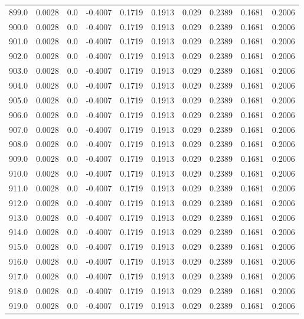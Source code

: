 \begin{longtable}{lrrrrrrrrr}
899.0 & 0.0028 & 0.0 & -0.4007 & 0.1719 & 0.1913 & 0.029 & 0.2389 & 0.1681 & 0.2006 \\
900.0 & 0.0028 & 0.0 & -0.4007 & 0.1719 & 0.1913 & 0.029 & 0.2389 & 0.1681 & 0.2006 \\
901.0 & 0.0028 & 0.0 & -0.4007 & 0.1719 & 0.1913 & 0.029 & 0.2389 & 0.1681 & 0.2006 \\
902.0 & 0.0028 & 0.0 & -0.4007 & 0.1719 & 0.1913 & 0.029 & 0.2389 & 0.1681 & 0.2006 \\
903.0 & 0.0028 & 0.0 & -0.4007 & 0.1719 & 0.1913 & 0.029 & 0.2389 & 0.1681 & 0.2006 \\
904.0 & 0.0028 & 0.0 & -0.4007 & 0.1719 & 0.1913 & 0.029 & 0.2389 & 0.1681 & 0.2006 \\
905.0 & 0.0028 & 0.0 & -0.4007 & 0.1719 & 0.1913 & 0.029 & 0.2389 & 0.1681 & 0.2006 \\
906.0 & 0.0028 & 0.0 & -0.4007 & 0.1719 & 0.1913 & 0.029 & 0.2389 & 0.1681 & 0.2006 \\
907.0 & 0.0028 & 0.0 & -0.4007 & 0.1719 & 0.1913 & 0.029 & 0.2389 & 0.1681 & 0.2006 \\
908.0 & 0.0028 & 0.0 & -0.4007 & 0.1719 & 0.1913 & 0.029 & 0.2389 & 0.1681 & 0.2006 \\
909.0 & 0.0028 & 0.0 & -0.4007 & 0.1719 & 0.1913 & 0.029 & 0.2389 & 0.1681 & 0.2006 \\
910.0 & 0.0028 & 0.0 & -0.4007 & 0.1719 & 0.1913 & 0.029 & 0.2389 & 0.1681 & 0.2006 \\
911.0 & 0.0028 & 0.0 & -0.4007 & 0.1719 & 0.1913 & 0.029 & 0.2389 & 0.1681 & 0.2006 \\
912.0 & 0.0028 & 0.0 & -0.4007 & 0.1719 & 0.1913 & 0.029 & 0.2389 & 0.1681 & 0.2006 \\
913.0 & 0.0028 & 0.0 & -0.4007 & 0.1719 & 0.1913 & 0.029 & 0.2389 & 0.1681 & 0.2006 \\
914.0 & 0.0028 & 0.0 & -0.4007 & 0.1719 & 0.1913 & 0.029 & 0.2389 & 0.1681 & 0.2006 \\
915.0 & 0.0028 & 0.0 & -0.4007 & 0.1719 & 0.1913 & 0.029 & 0.2389 & 0.1681 & 0.2006 \\
916.0 & 0.0028 & 0.0 & -0.4007 & 0.1719 & 0.1913 & 0.029 & 0.2389 & 0.1681 & 0.2006 \\
917.0 & 0.0028 & 0.0 & -0.4007 & 0.1719 & 0.1913 & 0.029 & 0.2389 & 0.1681 & 0.2006 \\
918.0 & 0.0028 & 0.0 & -0.4007 & 0.1719 & 0.1913 & 0.029 & 0.2389 & 0.1681 & 0.2006 \\
919.0 & 0.0028 & 0.0 & -0.4007 & 0.1719 & 0.1913 & 0.029 & 0.2389 & 0.1681 & 0.2006 \\

\end{longtable}
